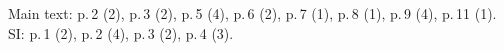 Main text: p.\,2 (2), p.\,3 (2), p.\,5 (4), p.\,6 (2), p.\,7 (1), p.\,8 (1), p.\,9 (4), p.\,11 (1). SI: p.\,1 (2), p.\,2 (4), p.\,3 (2), p.\,4 (3).